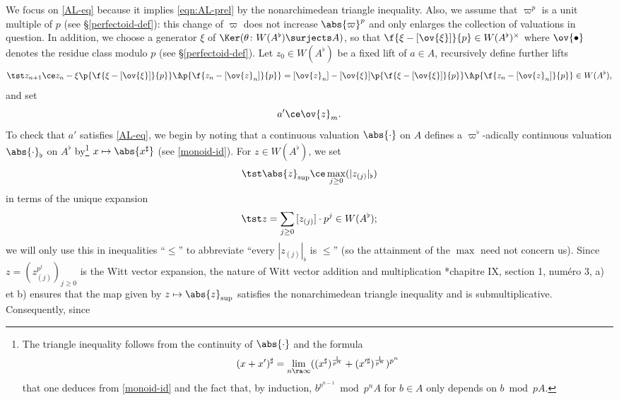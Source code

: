 We focus on \eqref{AL-eq} because it implies \eqref{eqn:AL-prel} by the nonarchimedean triangle inequality. Also, we assume that $\varpi^p$ is a unit multiple of $p$ (see \S\ref{perfectoid-def}): this change of $\varpi$ does not increase $\abs{\varpi}^p$ and only enlarges the collection of valuations in question. In addition, we %
choose a generator $\xi$ of $\Ker(\theta \colon W(A^\flat) \surjects A)$, so that %
$\f{\xi - [\ov{\xi}]}{p} \in W(A^\flat)^\times$ where $\ov{\bullet}$ denotes the residue class modulo $p$ (see \S\ref{perfectoid-def}). Let $z_0 \in W(A^\flat)$ be a fixed lift of $a \in A$, %
recursively define further lifts
\[
\tst z_{n + 1} \ce z_n - \xi  \p{\f{\xi - [\ov{\xi}]}{p}}\i \!\! \p{\f{z_n - [\ov{z}_n]}{p}} = [\ov{z}_n] - [\ov{\xi}] \p{\f{\xi - [\ov{\xi}]}{p}}\i\!\! \p{\f{z_n - [\ov{z}_n]}{p}} \in W(A^\flat),
\]
and set
\[
a' \ce \ov{z}_m.
\]
To check that $a'$ satisfies \eqref{AL-eq}, we begin by noting that a continuous valuation $\abs{\cdot}$ on $A$ defines a $\varpi^\flat$-adically continuous valuation $\abs{\cdot}_{\flat}$ on $A^\flat$ by\footnote{The triangle inequality follows from the continuity of $\abs{\cdot}$ and the formula
\[
(x + x')^\sharp = \lim_{n \ra \infty} ((x^\sharp)^{\frac{1}{p^n}} + (x'^\sharp)^{\frac{1}{p^n}})^{p^n}
\]
that one deduces from \eqref{monoid-id} and the fact that, by induction, $b^{p^{n - 1}} \bmod p^nA$ for $b \in A$ only depends on $b \bmod pA$.} $x \mapsto \abs{x^\sharp}$ (see \eqref{monoid-id}). For $z \in W(A^\flat)$, we set
\[
\tst \abs{z}_{\sup} \ce \max_{j \ge 0} (|z_{(j)}|_\flat)
\]
in terms of the unique expansion
\[
\tst  z = \sum_{j \ge 0}\, [z_{(j)}]\cdot p^j \in W(A^\flat);
\]
we will only use this in inequalities ``$\le$'' to abbreviate ``every $|z_{(j)}|_\flat$ is $\le$'' (so the attainment of the $\max$ need not concern us). Since $z = (z_{(j)}^{p^j})_{j \ge 0}$ is the Witt vector expansion, the nature of Witt vector addition and multiplication  \cite{BouAC}*{chapitre IX, section 1, num\'{e}ro 3, a) et b)} ensures that the map given by $z \mapsto \abs{z}_{\sup}$ satisfies the nonarchimedean triangle inequality and  is submultiplicative.  Consequently, since
